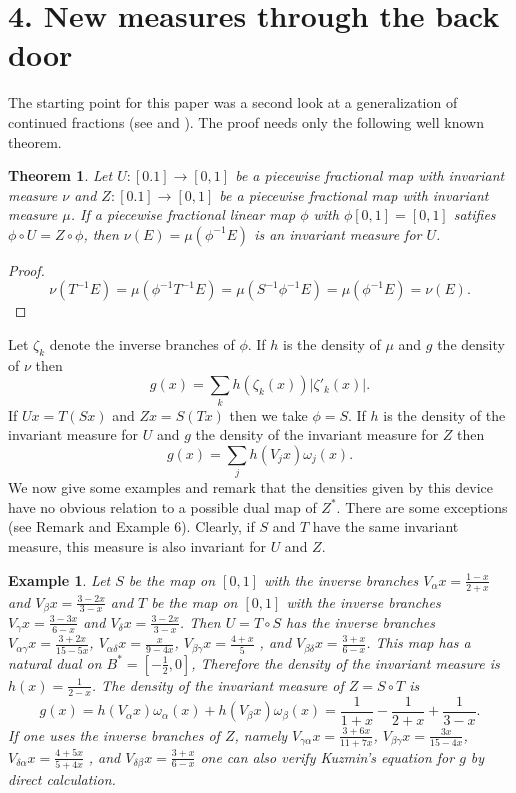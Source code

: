 \documentclass[12pt]{article}
\newtheorem{theorem}{Theorem}
\newtheorem{example}{Example}
\begin{document}
  \section*{4. New measures through the back door}
 
 The starting point for this paper was a second look at a generalization of continued fractions (see \cite{Da} and \cite{Sch21}). The proof needs only the following  well known theorem.
 \begin{theorem}
 Let $U: [0. 1] \to [0,1]$ be a piecewise fractional map with invariant measure $\nu$ and $Z: [0. 1] \to [0,1]$  be a piecewise fractional map with invariant measure $\mu$.
 If  a piecewise fractional linear map $\phi$ with $\phi[0,1] = [0,1]$ satifies $\phi \circ U = Z \circ \phi$, then $\nu(E) = \mu( \phi^{-1}E)$ is an invariant measure for $U$.
 \end{theorem}
\begin{proof}
$$\nu(T^{-1}E ) = \mu(\phi^{-1}T^{-1}E)= \mu(S^{-1}\phi^{-1}E) = \mu(\phi^{-1}E)= \nu(E).$$
 \end{proof}
Let $\zeta_{k}$ denote the inverse branches of $\phi$. If $h$ is the density of $\mu$ and $g$ the density of $\nu$ then
$$g(x) = \sum_k h(\zeta_k(x)) \left| \zeta'_k (x) \right| .$$
If $Ux = T(Sx)$ and $Zx = S(Tx)$ then we take $\phi = S$. If $h$ is the density of the invariant measure for $U$ and $g$ the density of the invariant measure for $Z$ then
$$g(x)= \sum_j h(V_jx) \omega_j(x).$$
We now give some examples and remark that the densities given by this device have no obvious relation to a possible dual map of $Z^{*}$. There are some exceptions (see Remark and Example 6). Clearly, if $S$ and $T$ have the same invariant measure, this measure is also invariant for $U$ and $Z$.
\begin{example}
Let $S$ be the map on $[0,1]$ with the inverse branches $V_{\alpha}x = \frac{1-x}{2+x}$ and $V_{\beta}x = \frac{3-2x}{3-x}$ and $T$ be the map on $[0,1]$ with the inverse branches $V_{\gamma}x = \frac{3-3x}{6-x}$ and $V_{\delta}x = \frac{3-2x}{3-x}$. Then $U = T \circ S$ has the inverse branches $V_{\alpha \gamma }x = \frac{3+2x}{15 -5x}$, $V_{\alpha \delta }x = \frac{x}{9-4x}$, $V_{\beta \gamma}x = \frac{4+x}{5}$ , and $V_{\beta \delta}x = \frac{3+x}{6-x}$. This map has a natural dual on
$B^{*} = [-\frac{1}{2}, 0] $, Therefore the density of the invariant measure is $h(x)= \frac{1}{2-x}$. The density of the invariant measure of $Z=S \circ T$ is $$g(x)= h(V_{\alpha}x)\omega_{\alpha}(x) + h(V_{\beta}x)\omega_{\beta}(x) = \frac{1}{1+x} - \frac{1}{2+x} +\frac{1}{3-x}.$$
If one uses the inverse branches of $Z$, namely 
$V_{ \gamma \alpha}x = \frac{3+6x}{11 + 7x}$, $V_{\beta \gamma }x = \frac{3x}{15-4x}$, $V_{\delta \alpha}x = \frac{4+5x}{5+4x}$ , and $V_{\delta \beta}x = \frac{3+x}{6-x}$ one can also verify Kuzmin's equation for $g$ by direct calculation.
\end{example}
\end{document}
